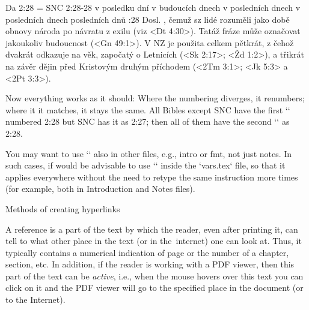 \renum Da 2:28 = SNC 2:28-28
    {v posledku dní}      %
    {v budoucích dnech}   %
    {v posledních dnech}  %
    {v posledních dnech}  %
    {posledních dnů}      %
:28 {} Dosl. , čemuž sz lidé rozuměli jako době obnovy národa
po návratu z exilu (viz <Dt 4:30>). Tatáž fráze může označovat jakoukoliv budoucnost
(<Gn 49:1>). V NZ je použita celkem pětkrát, z čehož dvakrát odkazuje na věk, započatý
o Letnicích (<Sk 2:17>; <Žd 1:2>), a třikrát na závěr dějin
před Kristovým druhým příchodem (<2Tm 3:1>; <Jk 5:3> a <2Pt 3:3>). 

\endtt

Now everything works as it should: Where the numbering diverges, it renumbers; where it it matches, it stays the same. All Bibles except SNC have the first `\Note` numbered 2:28 but SNC has it as 2:27; then all of them have the second `\Note` as 2:28.

\recommended
You may want to use `\renum` also in other files, e.g., intro or fmt, not just 
notes. In such cases, if would be advisable to use `\renum` inside the 
`vars.tex` file, so that it applies everywhere without the need to retype 
the same instruction more times (for example, both in Introduction and Notes 
files).



\sec[links] Methods of creating hyperlinks

A reference is a part of the text by which the reader, even after printing it, can tell to what other place in the text (or in the~internet) one can look at. Thus, it typically contains a numerical indication of page or the number of a chapter, section, etc. In addition, if the reader is working with a PDF viewer, then this part of the text can be {\em active}, i.e., when the mouse hovers over
this text you can click on it and the PDF viewer will go to the specified place in the document (or to the Internet).

